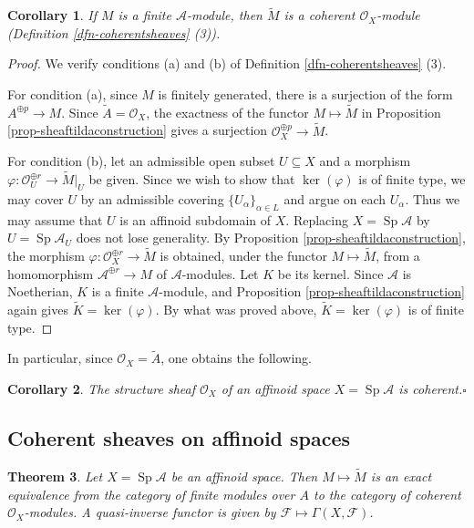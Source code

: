 \documentclass[a4paper,12pt, dvipdfmx]{jsbook}
\def\O{\mathscr{O}}
\def\til#1{\widetilde{#1}}%
\def\Sp{\mathop{\mathrm{Sp}}\nolimits}
\def\ker{\mathop{\mathrm{ker}}\nolimits}
\theoremstyle{plain}
\newtheorem{thm}{\bfseries Theorem}[section]
\newtheorem{cor}[thm]{\bfseries Corollary}
\theoremstyle{definition}
\begin{document}
\begin{cor}\label{cor-sheaftildaconstruction}{\rm 
If $M$ is a finite $\mathcal{A}$-module, then $\til{M}$ is a coherent $\O_X$-module (Definition \ref{dfn-coherentsheaves} (3)).}
\end{cor}

\begin{proof}[Proof]
We verify conditions (a) and (b) of Definition \ref{dfn-coherentsheaves} (3).

For condition (a), since $M$ is finitely generated, there is a surjection of the form $A^{\oplus p}\rightarrow M$.
Since $\til{A}=\O_X$, the exactness of the functor $M\mapsto\til{M}$ in Proposition \ref{prop-sheaftildaconstruction} gives a surjection $\O^{\oplus p}_X\rightarrow\til{M}$.

For condition (b), let an admissible open subset $U\subseteq X$ and a morphism $\varphi\colon\O^{\oplus r}_U\rightarrow\til{M}|_U$ be given.
Since we wish to show that $\ker(\varphi)$ is of finite type, we may cover $U$ by an admissible covering $\{U_{\alpha}\}_{\alpha\in L}$ and argue on each $U_{\alpha}$.
Thus we may assume that $U$ is an affinoid subdomain of $X$.
Replacing $X=\Sp\mathcal{A}$ by $U=\Sp\mathcal{A}_U$ does not lose generality.
By Proposition \ref{prop-sheaftildaconstruction}, the morphism $\varphi\colon\O^{\oplus r}_X\rightarrow\til{M}$ is obtained, under the functor $M\mapsto\til{M}$, from a homomorphism $\mathcal{A}^{\oplus r}\rightarrow M$ of $\mathcal{A}$-modules.
Let $K$ be its kernel.
Since $\mathcal{A}$ is Noetherian, $K$ is a finite $\mathcal{A}$-module, and Proposition \ref{prop-sheaftildaconstruction} again gives $\til{K}=\ker(\varphi)$.
By what was proved above, $\til{K}=\ker(\varphi)$ is of finite type.
\end{proof}

In particular, since $\O_X=\til{A}$, one obtains the following.
\begin{cor}\label{cor-structuresheafcoherence}{\rm 
The structure sheaf $\O_X$ of an affinoid space $X=\Sp\mathcal{A}$ is coherent.}\hfill$\square$
\end{cor}

\subsection{Coherent sheaves on affinoid spaces}\label{sub-coherentsheafaffinoids}
\begin{thm}\label{thm-coherentsheafaffinoidsA}{\rm 
Let $X=\Sp\mathcal{A}$ be an affinoid space.
Then $M\mapsto\til{M}$ is an exact equivalence from the category of finite modules over $A$ to the category of coherent $\O_X$-modules.
A quasi-inverse functor is given by $\mathscr{F}\mapsto\Gamma(X,\mathscr{F})$.}
\end{thm}
\end{document}
